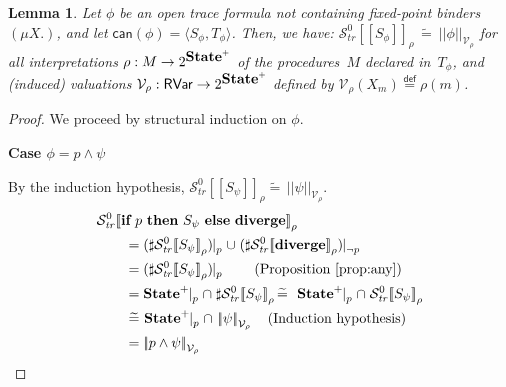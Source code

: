 \documentclass[10pt,a4paper]{amsart}
\newtheorem{lemma}[theorem]{Lemma}
\theoremstyle{definition}
\newcommand{\defeq}{\stackrel{\mathsf{def}}{=}}
\newcommand{\denot}[1]{\left[\!\left[#1\right]\!\right]}
\newcommand{\trcdenot}[1]{\mathcal{S}_{\mathit{tr}}\!\denot{#1}}
\newcommand{\trcdenoth}[1]{\mathcal{S}^0_{\mathit{tr}}\!\denot{#1}}
\newcommand{\logdenotV}[2]{\left|\!\left|#1\right|\!\right|_{#2}}
\newcommand{\restr}[2]{\!\!\mid_{#1}^{#2}}
\newcommand{\can}[1]{\mathsf{can} (#1)}
\newcommand{\Skip}{\mbox{\bf skip}}
\newcommand{\If}{\mbox{\bf if}}
\newcommand{\Then}{\mbox{\bf then}}
\newcommand{\Else}{\mbox{\bf else}}
\newcommand{\Abort}{\mbox{\bf diverge}}
\newcommand{\State}{\mbox{\bf State}}
\begin{document}
\begin{lemma}
\label{lem:can-characterisation-rec}
  Let $\phi$ be an open trace formula not containing fixed-point 
  binders~$(\mu X.)$, and let
  $\can{\phi} = \langle S_\phi, T_\phi \rangle$.
  Then, we have:
  $ \trcdenoth{S_\phi}_\rho \,\widetilde{=}\ 
     \logdenotV{\phi}{\mathcal{V}_\rho} $
  for all interpretations $\rho : M \rightarrow 2^{\State^+}$
  of the procedures~$M$ declared in~$T_\phi$, and (induced) valuations 
  $\mathcal{V}_\rho : \mathsf{RVar} \rightarrow 2^{\State^+}$
  defined by
  $\mathcal{V}_\rho (X_m) \defeq \rho (m)$.
\end{lemma}

\begin{proof}%
  We proceed by structural induction on $\phi$.

  \noindent\textbf{Case $\phi = p \land \psi$}
  
  By the induction hypothesis,
  $\trcdenoth{S_\psi}_\rho \widetilde{=}\,
  \logdenotV{\psi}{\mathcal{V}_\rho}$.%
  \begin{align*}
    & \trcdenoth{\If\ p\ \Then\ S_\psi\ \Else\ \Abort}_\rho
      \\
    & \qquad = (\sharp\trcdenoth{S_\psi}_\rho)\restr{p}{}\cup\;(\sharp\trcdenoth{\Abort}_\rho)\restr{\neg p}{}\\
    & \qquad = (\sharp\trcdenoth{S_\psi}_\rho)\restr{p}{}\quad\quad
         \text{(Proposition~\ref{prop:any})}\\
    & \qquad = \State^+\restr{p}{}\cap\;\sharp\trcdenoth{S_\psi}_\rho \widetilde{=}\ \ \State^+\restr{p}{}\cap\;\trcdenoth{S_\psi}_\rho\\
    & \qquad \;\widetilde{=}\ \State^+\restr{p}{}\cap\,\logdenotV{\psi}{\mathcal{V}_\rho}\quad\text{(Induction hypothesis)}\\
    & \qquad = \logdenotV{p\land\psi}{\mathcal{V}_\rho}
  \end{align*}


\end{proof}
\end{document}
